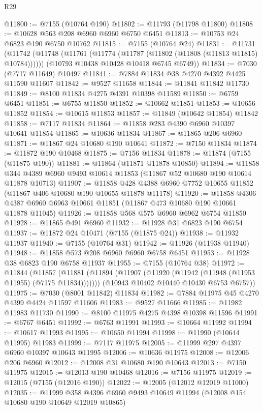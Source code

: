 \begin{lexlean}{R29}
\begin{coremodule}
@11800 := @7155 (@10764 @190)
@11802 := @11793 (@11798 @11800)
@11808 := @10628 @563 @208 @6960 @6960 @6750 @6451
@11813 := @10753 @24 @6823 @190 @6750 @10762
@11815 := @7155 (@10764 @24)
@11831 := @11731
    (@11742
      (@11748 (@11761 (@11774 (@11787 (@11802 (@11808 (@11813 @11815) @10784))))))
      (@10793 @10438 @10428 @10418 @6745 @6749))
@11834 := @7030 (@7717 @11649) @10497
@11841 := @7884 @11834 @38 @4270 @4392 @4425 @11590 @11607
@11842 := @9527 @11658
@11844 := @11841 @11842 @11730
@11849 := @8100 @11834 @4275 @4391 @10398 @11589
@11850 := @6759 @6451
@11851 := @6755 @11850
@11852 := @10662 @11851
@11853 := @10656 @11852
@11854 := @10615 @11853
@11857 := @11849 (@10642 @11854) @11842
@11858 := @7117 @11834
@11864 := @11858 @283 @4390 @6960 @10397 @10641 @11854
@11865 := @10636 @11834
@11867 := @11865 @206 @6960
@11871 := @11867 @24 @10680 @190 @10641
@11872 := @7150 @11834
@11874 := @11872 @190 @10468
@11875 := @7156 @11834
@11878 := @11874 (@7155 (@11875 @190))
@11881 := @11864 (@11871 @11878 @10850)
@11894 := @11858 @344 @4389 @6960 @9493 @10614 @11853 (@11867 @52 @10680 @190 @10614 @11878 @10713)
@11907 := @11858 @428 @4388 @6960 @7752 @10655 @11852 (@11867 @406 @10680 @190 @10655 @11878 @11178)
@11920 := @11858
    @4306
    @4387
    @6960
    @6963
    @10661
    @11851
    (@11867 @473 @10680 @190 @10661 @11878 @11045)
@11926 := @11858 @568 @575 @6960 @6962 @6754 @11850
@11928 := @11865 @491 @6960
@11932 := @11928 @31 @6823 @190 @6754
@11937 := @11872 @24 @10471 (@7155 (@11875 @24))
@11938 := @11932 @11937
@11940 := @7155 (@10764 @31)
@11942 := @11926 (@11938 @11940)
@11948 := @11858 @573 @208 @6960 @6960 @6758 @6451
@11953 := @11928 @38 @6823 @190 @6758 @11937
@11955 := @7155 (@10764 @38)
@11972 := @11844
    (@11857
      (@11881 (@11894 (@11907 (@11920 (@11942 (@11948 (@11953 @11955) (@7175 @11834)))))))
      (@10943 @10402 @10440 @10430 @6753 @6757))
@11975 := @7030 (@8001 @11842) @11834
@11982 := @7884 @11975 @45 @4270 @4399 @4424 @11597 @11606
@11983 := @9527 @11666
@11985 := @11982 @11983 @11730
@11990 := @8100 @11975 @4275 @4398 @10398 @11596
@11991 := @6767 @6451
@11992 := @6763 @11991
@11993 := @10664 @11992
@11994 := @10617 @11993
@11995 := @10650 @11994
@11998 := @11990 (@10644 @11995) @11983
@11999 := @7117 @11975
@12005 := @11999 @297 @4397 @6960 @10397 @10643 @11995
@12006 := @10636 @11975
@12008 := @12006 @206 @6960
@12012 := @12008 @31 @10680 @190 @10643
@12013 := @7150 @11975
@12015 := @12013 @190 @10468
@12016 := @7156 @11975
@12019 := @12015 (@7155 (@12016 @190))
@12022 := @12005 (@12012 @12019 @11000)
@12035 := @11999 @358 @4396 @6960 @9493 @10649 @11994 (@12008 @154 @10680 @190 @10649 @12019 @10865)

\end{coremodule}
\end{lexlean}
